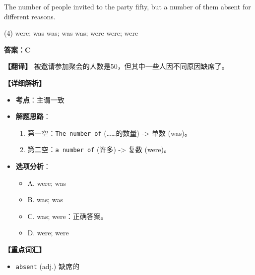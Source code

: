 \documentclass[11pt, a4paper]{article}
\newcommand{\analysis}[4]{
    \begin{solutionbox}
        \textbf{答案：#1}
        
        \textbf{【翻译】} #2
        
        \textbf{【详细解析】}
        #3
        
        \textbf{【重点词汇】}
        #4
    \end{solutionbox}
}
\newcommand{\blank}{\underline{\hspace{1.5cm}}}
\begin{document}
\begin{questions}
    \item The number of people invited to the party \blank fifty, but a number of them \blank absent for different reasons.
    \begin{tasks}(4)
        \task were; was \task was; was \task was; were \task were; were
    \end{tasks}
    \analysis{C}{被邀请参加聚会的人数是50，但其中一些人因不同原因缺席了。}{
        \begin{itemize}
            \item \textbf{考点}：主谓一致
            \item \textbf{解题思路}：
                \begin{enumerate}
                    \item 第一空：\texttt{The number of} (……的数量) -> 单数 (was)。
                    \item 第二空：\texttt{a number of} (许多) -> 复数 (were)。
                \end{enumerate}
            \item \textbf{选项分析}：
                \begin{itemize}
                    \item A. were; was
                    \item B. was; was
                    \item C. was; were：正确答案。
                    \item D. were; were
                \end{itemize}
        \end{itemize}
    }{
        \begin{itemize}
            \item \texttt{absent} (adj.) 缺席的
        \end{itemize}
    }


\end{questions}
\end{document}
